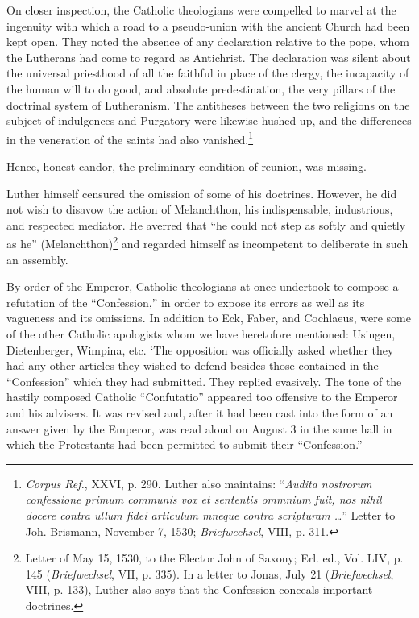 On closer inspection, the Catholic theologians were compelled to
marvel at the ingenuity with which a road to a pseudo-union with the
ancient Church had been kept open. They noted the absence of any
declaration relative to the pope, whom the Lutherans had come to
regard as Antichrist. The declaration was silent about the universal
priesthood of all the faithful in place of the clergy, the incapacity
of the human will to do good, and absolute predestination, the very
pillars of the doctrinal system of Lutheranism. The antitheses between
the two religions on the subject of indulgences and Purgatory were
likewise hushed up, and the differences in the veneration of the saints
had also vanished.\footnote
{\textit{Corpus Ref.}, XXVI, p. 290. Luther also maintains: ``\textit{Audita nostrorum confessione
primum communis vox et sententis ommnium fuit, nos nihil docere contra ullum fidei
articulum mneque contra scripturam \dots }'' Letter to Joh. Brismann, November 7, 1530;
\textit{Briefwechsel}, VIII, p. 311.}


Hence, honest candor, the preliminary condition of reunion, was
missing.

Luther himself censured the omission of some of his doctrines.
However, he did not wish to disavow the action of Melanchthon, his
indispensable, industrious, and respected mediator. He averred that
“he could not step as softly and quietly as he” (Melanchthon)\footnote
{Letter of May 15, 1530, to the Elector John of Saxony; Erl. ed., Vol. LIV, p. 145
(\textit{Briefwechsel}, VII, p. 335). In a letter to Jonas, July 21 (\textit{Briefwechsel}, VIII, p. 133),
Luther also says that the Confession conceals important doctrines.}
and regarded himself as incompetent to deliberate in such an assembly.

By order of the Emperor, Catholic theologians at once undertook
to compose a refutation of the “Confession,” in order to expose its
errors as well as its vagueness and its omissions. In addition to Eck,
Faber, and Cochlaeus, were some of the other Catholic apologists
whom we have heretofore mentioned: Usingen, Dietenberger, Wimpina, etc.
‘The opposition was officially asked whether they had any
other articles they wished to defend besides those contained in the
“Confession” which they had submitted. They replied evasively. The
tone of the hastily composed Catholic “Confutatio” appeared too offensive
to the Emperor and his advisers. It was revised and, after it had
been cast into the form of an answer given by the Emperor, was read
aloud on August 3 in the same hall in which the Protestants had been
permitted to submit their “Confession.”

